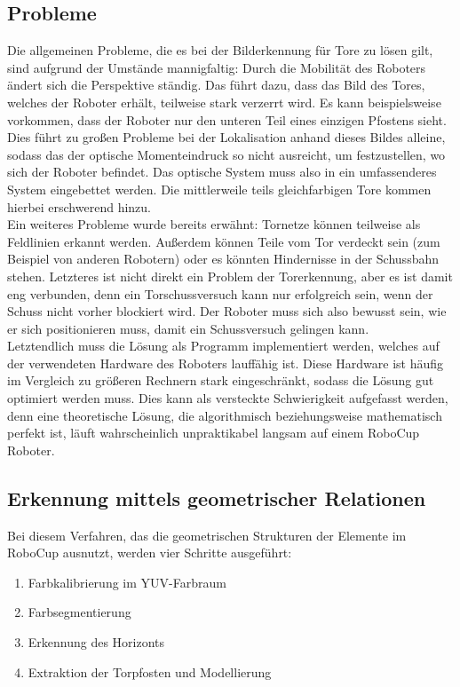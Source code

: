 \documentclass[a4paper,12pt]{article}
\begin{document}
\subsection{Probleme}
Die allgemeinen Probleme, die es bei der Bilderkennung für Tore zu lösen gilt, sind aufgrund
der Umstände mannigfaltig: Durch die Mobilität des Roboters ändert sich die Perspektive ständig. Das
führt dazu, dass das Bild des Tores, welches der Roboter erhält, teilweise stark verzerrt wird. Es
kann beispielsweise vorkommen, dass der Roboter nur den unteren Teil eines einzigen Pfostens sieht.
Dies führt zu großen Probleme bei der Lokalisation anhand dieses Bildes alleine, sodass das der
optische Momenteindruck so nicht ausreicht, um festzustellen, wo sich der Roboter befindet. Das
optische System muss also in ein umfassenderes System eingebettet werden. Die mittlerweile teils
gleichfarbigen Tore kommen hierbei erschwerend hinzu. \\

Ein weiteres Probleme wurde bereits erwähnt: Tornetze können teilweise als Feldlinien erkannt
werden. Außerdem können Teile vom Tor verdeckt sein (zum Beispiel von anderen Robotern) oder es könnten
Hindernisse in der Schussbahn stehen. Letzteres ist nicht direkt ein Problem der Torerkennung, aber
es ist damit eng verbunden, denn ein Torschussversuch kann nur erfolgreich sein, wenn der Schuss
nicht vorher blockiert wird. Der Roboter muss sich also bewusst sein, wie er sich positionieren
muss, damit ein Schussversuch gelingen kann. \\

Letztendlich muss die Lösung als Programm implementiert werden, welches auf der
verwendeten Hardware des Roboters lauffähig ist. Diese Hardware ist häufig
im Vergleich zu größeren Rechnern stark eingeschränkt, sodass die Lösung
gut optimiert werden muss. Dies kann als versteckte Schwierigkeit aufgefasst
werden, denn eine theoretische Lösung, die algorithmisch beziehungsweise mathematisch 
perfekt ist, läuft wahrscheinlich unpraktikabel langsam auf einem RoboCup
Roboter.

\newpage
\subsection{Erkennung mittels geometrischer Relationen}
Bei diesem Verfahren, das die geometrischen Strukturen der Elemente im RoboCup ausnutzt, werden
vier Schritte ausgeführt:
\begin{enumerate}
    \item Farbkalibrierung im YUV-Farbraum
    \item Farbsegmentierung
    \item Erkennung des Horizonts
    \item Extraktion der Torpfosten und Modellierung
\end{enumerate}
\end{document}
